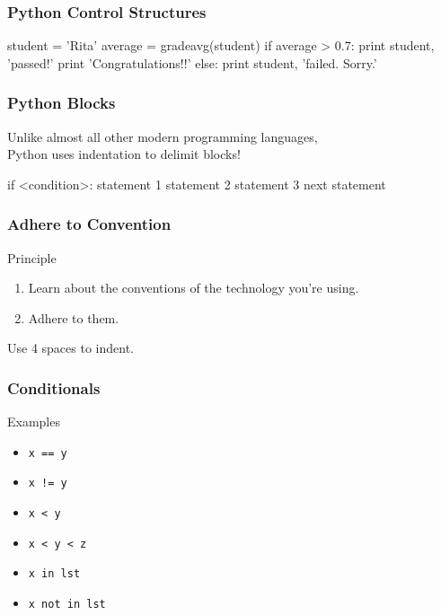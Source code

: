 \begin{frame}[fragile]
\frametitle{Python Control Structures}

\begin{python}
student = 'Rita'
average = gradeavg(student)
if average > 0.7:
    print student, 'passed!'
    print 'Congratulations!!'
else:
    print student, 'failed. Sorry.'
\end{python}
\end{frame}

\begin{frame}[fragile]
\frametitle{Python Blocks}

Unlike almost all other modern programming languages,\\
Python uses \alert{indentation} to delimit blocks!

\begin{python}
if <condition>:
    statement 1
    statement 2
    statement 3
next statement
\end{python}

\end{frame}

\begin{frame}[fragile]
\frametitle{Adhere to Convention}
\begin{block}{Principle}
\begin{enumerate}
\item Learn about the conventions of the technology you're using.
\item Adhere to them.
\end{enumerate}
\end{block}

Use 4 spaces to indent.
\end{frame}

\begin{frame}[fragile]
\frametitle{Conditionals}


\begin{block}{Examples}
\begin{itemize}
\item \lstinline{x == y}
\item \lstinline{x != y}
\item \lstinline{x < y}
\item \lstinline{x < y < z}
\item \lstinline{x in lst}
\item \lstinline{x not in lst}
\end{itemize}
\end{block}

\end{frame}

